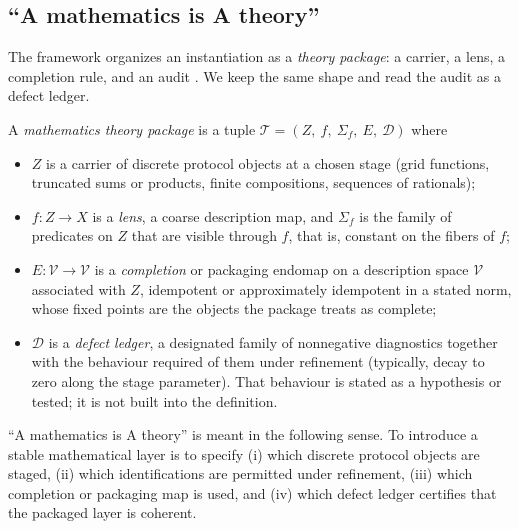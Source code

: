 \subsection{``A mathematics is A theory''}
The framework organizes an instantiation as a \emph{theory package}: a carrier, a lens, a completion rule, and an audit \cite{SixBirdsFramework}.
We keep the same shape and read the audit as a defect ledger.

\begin{definition}\label{def:math-theory-package}
A \emph{mathematics theory package} is a tuple $\mathcal T=(Z,\ f,\ \Sigma_f,\ E,\ \mathcal D)$ where
\begin{itemize}
  \item $Z$ is a carrier of discrete protocol objects at a chosen stage (grid functions, truncated sums or products, finite compositions, sequences of rationals);
  \item $f:Z\to X$ is a \emph{lens}, a coarse description map, and $\Sigma_f$ is the family of predicates on $Z$ that are visible through $f$, that is, constant on the fibers of $f$;
  \item $E:\mathcal V\to\mathcal V$ is a \emph{completion} or packaging endomap on a description space $\mathcal V$ associated with $Z$, idempotent or approximately idempotent in a stated norm, whose fixed points are the objects the package treats as complete;
  \item $\mathcal D$ is a \emph{defect ledger}, a designated family of nonnegative diagnostics together with the behaviour required of them under refinement (typically, decay to zero along the stage parameter). That behaviour is stated as a hypothesis or tested; it is not built into the definition.
\end{itemize}
\end{definition}

\begin{remark}\label{rem:math-is-theory}
``A mathematics is A theory'' is meant in the following sense.
To introduce a stable mathematical layer is to specify (i) which discrete protocol objects are staged, (ii) which identifications are permitted under refinement, (iii) which completion or packaging map is used, and (iv) which defect ledger certifies that the packaged layer is coherent.
\end{remark}

